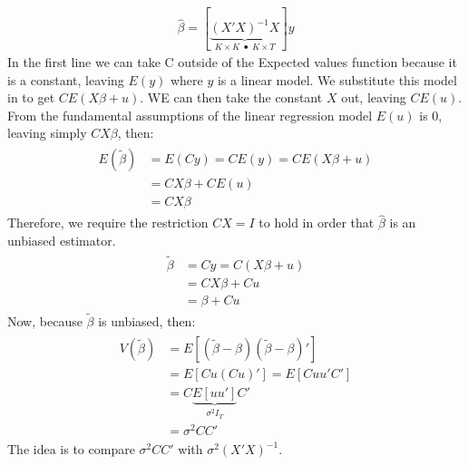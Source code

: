 \documentclass[letterpaper,10pt,english]{jupyterBook}
\begin{document}
\begin{equation*}
\begin{split}\hat \beta = [\underbrace{(X'X)^{-1} X}_{K \times K \;\bullet \; K \times T} ]y\end{split}
\end{equation*}
In the first line we can take C outside of the Expected values function
because it is a constant, leaving \(E(y)\) where \(y\) is a linear model. We
substitute this model in to get \(CE(X\beta + u)\). WE can then take the
constant \(X\) out, leaving \(CE(u)\). From the fundamental assumptions of
the linear regression model \(E(u)\) is 0, leaving simply \(CX\beta\), then:
\begin{equation*}
\begin{split}\begin{aligned}
    E(\tilde \beta) &= E(Cy) = CE(y) = CE(X \beta + u) \\
    &= CX\beta + CE(u) \\
    &= CX\beta      
  \end{aligned}\end{split}
\end{equation*}
Therefore, we require the restriction \(CX = I\) to hold in order that
\(\hat\beta\) is an unbiased estimator.
\begin{equation*}
\begin{split}\begin{aligned}
    \tilde \beta &= Cy = C(X\beta + u)\\ &= CX \beta + Cu \\& = \beta + Cu  
\end{aligned}\end{split}
\end{equation*}
Now, because \(\tilde\beta\) is unbiased, then:
\begin{equation*}
\begin{split}\begin{aligned}
      V(\tilde\beta) &= E[(\tilde\beta - \beta) (\tilde\beta - \beta)'] \\&= E[Cu(Cu)'] = E[Cuu'C'] \\ &= C\underbrace{E[uu']}_{\sigma^2 I_T}C' \\ &= \sigma^2CC'
\end{aligned}\end{split}
\end{equation*}
The idea is to compare \(\sigma^2CC'\) with \(\sigma^2(X'X)^{-1}\).
\end{document}
